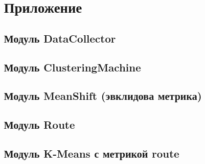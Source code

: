 \newpage

\chapter*{Приложение}

\renewcommand{\thesection}{\arabic{section}}
\section{Модуль DataCollector}
\label{sec:dc}


\section{Модуль ClusteringMachine}
\label{sec:cm}


\section{Модуль MeanShift (эвклидова метрика)}
\label{sec:mss}


\section{Модуль Route}
\label{sec:route}


\section{Модуль K-Means с метрикой route}
\label{sec:km}

